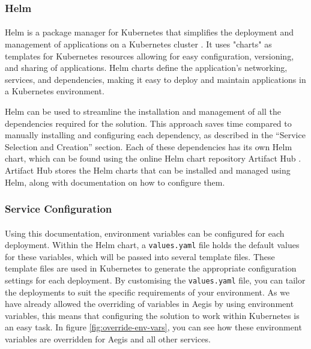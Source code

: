 \documentclass[12pt, conference, final, a4paper, onecolumn, compsoc]{IEEEtran}
\begin{document}
\subsubsection*{Helm}
\paragraph{}
Helm is a package manager for Kubernetes that simplifies the deployment and
management of applications on a Kubernetes cluster \citep{helm}. It uses
"charts" as templates for Kubernetes resources allowing for easy configuration,
versioning, and sharing of applications. Helm charts define the application's
networking, services, and dependencies, making it easy to deploy and maintain
applications in a Kubernetes environment.

Helm can be used to streamline the installation and management of all the
dependencies required for the solution. This approach saves time compared to
manually installing and configuring each dependency, as described in the
``Service Selection and Creation'' section. Each of these dependencies has its
own Helm chart, which can be found using the online Helm chart repository
Artifact Hub \citep{artifact-hub}. Artifact Hub stores the Helm charts that can
be installed and managed using Helm, along with documentation on how to
configure them.

\subsubsection*{Service Configuration}
\paragraph{}

Using this documentation, environment variables can be configured for each
deployment. Within the Helm chart, a \texttt{values.yaml} file holds the default
values for these variables, which will be passed into several template files.
These template files are used in Kubernetes to generate the appropriate
configuration settings for each deployment. By customising the
\texttt{values.yaml} file, you can tailor the deployments to suit the specific
requirements of your environment. As we have already allowed the overriding of
variables in Aegis by using environment variables, this means that configuring
the solution to work within Kubernetes is an easy task. In figure
\ref{fig:override-env-vars}, you can see how these environment variables are
overridden for Aegis and all other services.
\end{document}
